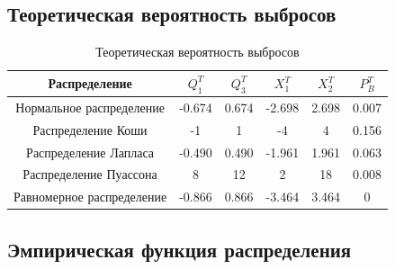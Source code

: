 \subsection{Теоретическая вероятность выбросов}

\begin{table}[H]
	\begin{center}
		\begin{tabular}{|c|c|c|c|c|c|}
			\hline 
			Распределение & $Q_{1}^{T}$ & $Q_{3}^{T}$ & $X_{1}^{T}$ & $X_{2}^{T}$ & $P_{B}^{T}$ \\
			\hline\hline 
			Нормальное распределение & -0.674 & 0.674  & -2.698  & 2.698 & 0.007 \\
			\hline
			Распределение Коши & -1 & 1 &-4  &4 &0.156 \\
			\hline
			Распределение Лапласа & -0.490 & 0.490 &-1.961  &1.961 &0.063 \\
			\hline
			Распределение Пуассона & 8 & 12  & 2  & 18 & 0.008 \\
			\hline
			Равномерное распределение & -0.866 & 0.866  & -3.464  & 3.464 & 0 \\
			\hline
		\end{tabular}
	\end{center}
	\caption{Теоретическая вероятность выбросов}
\end{table}

\subsection{Эмпирическая функция распределения}

